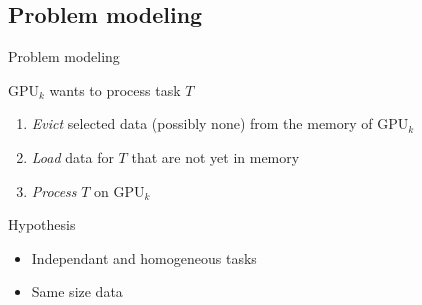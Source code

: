 \documentclass{libs/ufc_format}
\newcommand{\GPU}[1]{\ensuremath{\mathrm{GPU}_{#1}}\xspace}
\begin{document}
\subsection{Problem modeling}
\begin{frame}{Problem modeling}
\begin{block}{$\GPU{k}$ wants to process task $T$}
	\begin{enumerate}
		\item \emph{Evict} selected data (possibly none) from the memory of $\GPU{k}$
		\item \emph{Load} data for $T$ that are not yet in memory
		\item \emph{Process} $T$ on $\GPU{k}$
	\end{enumerate}
\end{block}
\begin{block}{Hypothesis}
	\begin{itemize}
		\item Independant and homogeneous tasks 
		\item Same size data 
	\end{itemize}
\end{block}
\end{frame}

\end{document}
